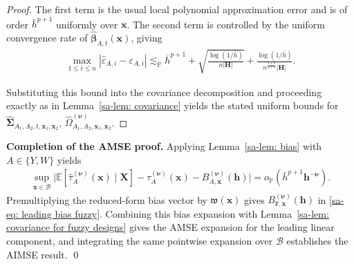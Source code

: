\documentclass[10pt]{article}
\renewcommand{\P}{\mathbb{P}}
\newcommand{\E}{\mathbb{E}}
\newcommand{\lessp}{\lesssim_{\mathbb{P}}}
\newcommand{\bh}{\mathbf{h}}
\newcommand{\bH}{\mathbf{H}}
\newcommand{\bx}{\mathbf{x}}
\newcommand{\bX}{\mathbf{X}}
\newcommand{\bbeta}{\boldsymbol{\beta}}
\newcommand{\bnu}{\boldsymbol{\nu}}
\newcommand{\bSigma}{\boldsymbol{\Sigma}}
\newcommand{\B}{\mathcal{B}}
\begin{document}
\begin{proof}
The first term is the usual local polynomial approximation error and is of order $\bar{h}^{p+1}$ uniformly over $\bx$.
The second term is controlled by the uniform convergence rate of
$\widehat{\bbeta}_{A,t}(\bx)$, giving
\begin{align*}
    \max_{1\le i\le n}
    |\widehat{\varepsilon}_{A,i}-\varepsilon_{A,i}|
    \lessp
    \bar{h}^{p+1}
    + \sqrt{\frac{\log(1/\bar{h})}{n |\bH|}}
    + \frac{\log(1/\bar{h})}{n^{\frac{1+v}{2+v}}|\bH|}.
\end{align*}

Substituting this bound into the covariance decomposition and proceeding exactly as in Lemma~\ref{sa-lem: covariance} yields the stated uniform bounds for
$\widehat{\bSigma}_{A_1,A_2,t,\bx_1,\bx_2}$,
$\widehat{\Omega}_{A_1,A_2,\bx_1,\bx_2}^{(\bnu)}$.
\end{proof}

\noindent\textbf{Completion of the AMSE proof.}
Applying Lemma~\ref{sa-lem: bias} with $A \in \{Y,W\}$ yields
\begin{align*}
    \sup_{\bx \in \B}
    \Big|
        \E[\widehat{\tau}_{A}^{(\bnu)}(\bx)\mid\bX]
        - \tau_{A}^{(\bnu)}(\bx)
        - B_{A,\bx}^{(\bnu)}(\bh)
    \Big|
    = o_{\P}\!\left(\bar{h}^{p+1}\bh^{-\bnu}\right).
\end{align*}
Premultiplying the reduced-form bias vector by $\mathfrak{w}(\bx)$ gives $B_{\mathtt{F},\bx}^{(\bnu)}(\bh)$ in \eqref{sa-eq: leading bias fuzzy}. Combining this bias expansion with Lemma~\ref{sa-lem: covariance for fuzzy designs} gives the AMSE expansion for the leading linear component, and integrating the same pointwise expansion over $\B$ establishes the AIMSE result. \qed



\end{document}
